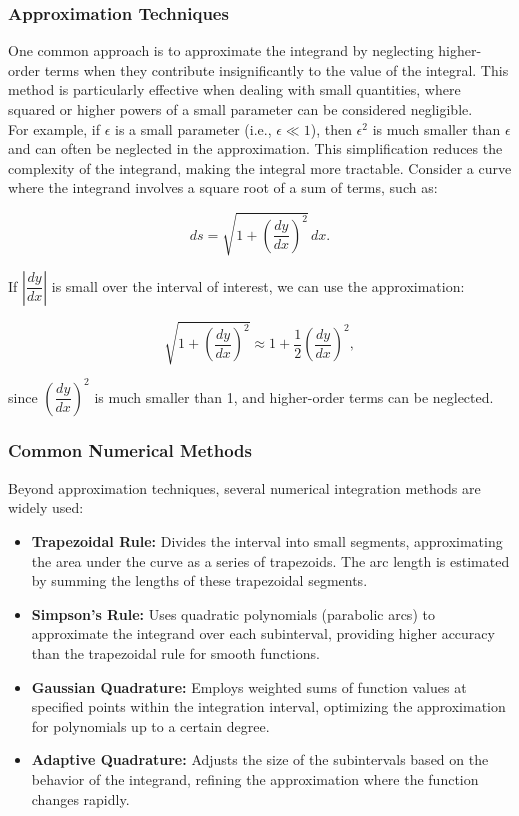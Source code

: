 \subsubsection*{Approximation Techniques}

\noindent One common approach is to approximate the integrand by neglecting higher-order terms when they contribute insignificantly to the value of the integral. This method is particularly effective when dealing with small quantities, where squared or higher powers of a small parameter can be considered negligible. \\

\noindent For example, if \( \epsilon \) is a small parameter (i.e., \( \epsilon \ll 1 \)), then \( \epsilon^2 \) is much smaller than \( \epsilon \) and can often be neglected in the approximation. This simplification reduces the complexity of the integrand, making the integral more tractable. Consider a curve where the integrand involves a square root of a sum of terms, such as:

\[
ds = \sqrt{1 + \left( \dfrac{dy}{dx} \right)^2 } \, dx.
\]

\noindent If \( \left| \dfrac{dy}{dx} \right| \) is small over the interval of interest, we can use the approximation:

\[
\sqrt{1 + \left( \dfrac{dy}{dx} \right)^2 } \approx 1 + \dfrac{1}{2} \left( \dfrac{dy}{dx} \right)^2,
\]

\noindent since \( \left( \dfrac{dy}{dx} \right)^2 \) is much smaller than 1, and higher-order terms can be neglected.

\subsubsection*{Common Numerical Methods}

\noindent Beyond approximation techniques, several numerical integration methods are widely used:

\begin{itemize}
    \item \textbf{Trapezoidal Rule:} Divides the interval into small segments, approximating the area under the curve as a series of trapezoids. The arc length is estimated by summing the lengths of these trapezoidal segments.
    \item \textbf{Simpson’s Rule:} Uses quadratic polynomials (parabolic arcs) to approximate the integrand over each subinterval, providing higher accuracy than the trapezoidal rule for smooth functions.
    \item \textbf{Gaussian Quadrature:} Employs weighted sums of function values at specified points within the integration interval, optimizing the approximation for polynomials up to a certain degree.
    \item \textbf{Adaptive Quadrature:} Adjusts the size of the subintervals based on the behavior of the integrand, refining the approximation where the function changes rapidly.
\end{itemize}

